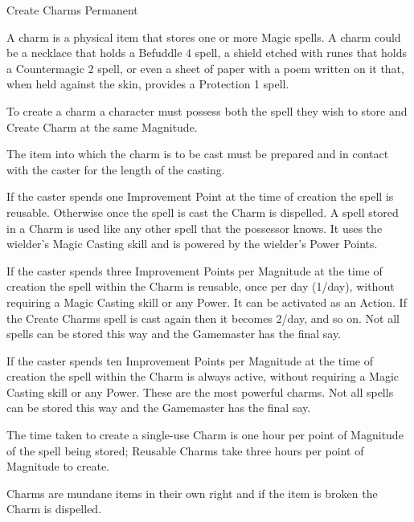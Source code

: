 \begin{rpg-spell}
{Create Charms}
{Permanent}

A charm is a physical item that stores one or more Magic spells. A charm could be a necklace that holds a Befuddle 4 spell, a shield etched with runes that holds a Countermagic 2 spell, or even a sheet of paper with a poem written on it that, when held against the skin, provides a Protection 1 spell.

\begin{rpg-list}
\item To create a charm a character must possess both the spell they wish to store and Create Charm at the same Magnitude.
\item The item into which the charm is to be cast must be prepared and in contact with the caster for the length of the casting.
\item If the caster spends one Improvement Point at the time of creation the spell is reusable. Otherwise once the spell is cast the Charm is dispelled. A spell stored in a Charm is used like any other spell that the possessor knows. It uses the wielder’s Magic Casting skill and is powered by the wielder’s Power Points.
\item If the caster spends three Improvement Points per Magnitude at the time of creation the spell within the Charm is reusable, once per day (1/day), without requiring a Magic Casting skill or any Power. It can be activated as an Action. If the Create Charms spell is cast again then it becomes 2/day, and so on. Not all spells can be stored this way and the Gamemaster has the final say.
\item If the caster spends ten Improvement Points per Magnitude at the time of creation the spell within the Charm is always active, without requiring a Magic Casting skill or any Power. These are the most powerful charms. Not all spells can be stored this way and the Gamemaster has the final say.
\item The time taken to create a single-use Charm is one hour per point of Magnitude of the spell being stored; Reusable Charms take three hours per point of Magnitude to create.
\item Charms are mundane items in their own right and if the item is broken the Charm is dispelled.
\end{rpg-list}
\end{rpg-spell}


